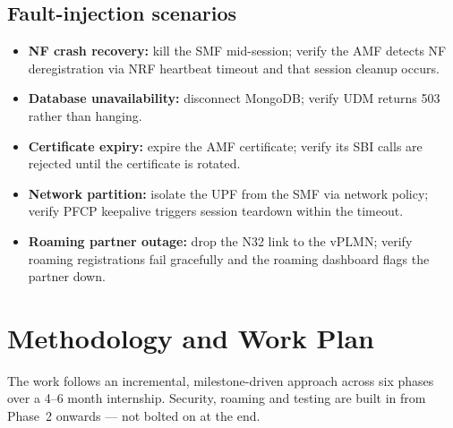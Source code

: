 \documentclass[11pt,a4paper]{report}
\begin{document}
\subsection{Fault-injection scenarios}
\begin{itemize}[leftmargin=1.4em]
  \item \textbf{NF crash recovery:} kill the SMF mid-session; verify the AMF detects NF
        deregistration via NRF heartbeat timeout and that session cleanup occurs.
  \item \textbf{Database unavailability:} disconnect MongoDB; verify UDM returns 503 rather
        than hanging.
  \item \textbf{Certificate expiry:} expire the AMF certificate; verify its SBI calls are
        rejected until the certificate is rotated.
  \item \textbf{Network partition:} isolate the UPF from the SMF via network policy; verify
        PFCP keepalive triggers session teardown within the timeout.
  \item \textbf{Roaming partner outage:} drop the N32 link to the vPLMN; verify roaming
        registrations fail gracefully and the roaming dashboard flags the partner down.
\end{itemize}

\section{Methodology and Work Plan}
The work follows an incremental, milestone-driven approach across six phases over a
4--6 month internship. Security, roaming and testing are built in from Phase~2 onwards ---
not bolted on at the end.
\end{document}
